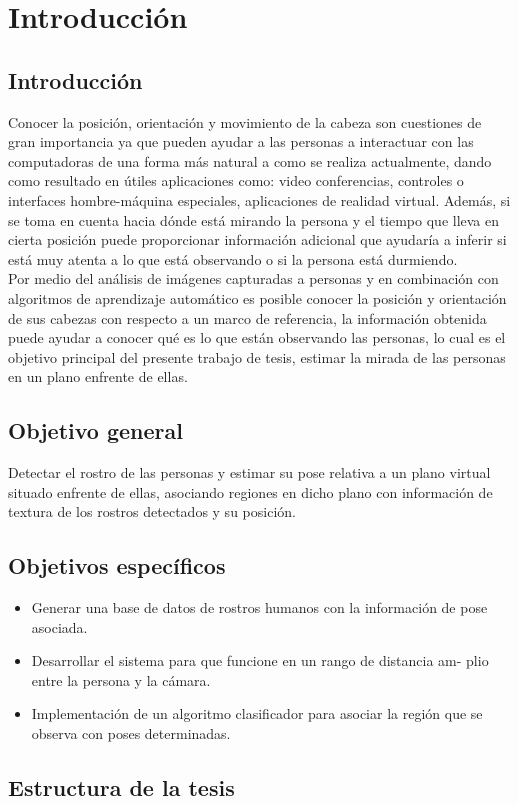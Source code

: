 \chapter{Introducción}
\section{Introducción}

  Conocer la posición, orientación y movimiento de la cabeza son cuestiones de gran importancia ya que pueden ayudar a las personas a interactuar con las computadoras de una forma más natural a como se realiza actualmente, dando como resultado en útiles  aplicaciones como: video conferencias, controles o interfaces hombre-máquina especiales, aplicaciones de realidad virtual. Además, si se toma en cuenta hacia dónde está mirando la persona y el tiempo que lleva en cierta posición puede proporcionar información adicional que ayudaría a inferir si está muy atenta a lo que está observando o si la persona está durmiendo.\\
  Por medio del análisis de imágenes capturadas a personas y en combinación con algoritmos de aprendizaje automático es posible conocer la posición y  orientación de sus cabezas con respecto a un marco de referencia, la información obtenida puede ayudar a conocer qué es lo que están observando las personas, lo cual es el objetivo principal del presente trabajo de tesis, estimar la mirada de las personas en un plano enfrente de ellas.
  
  \section{Objetivo general}
  Detectar el rostro de las personas y estimar su pose relativa a un plano virtual situado enfrente de ellas, asociando regiones en dicho plano con información de textura de los rostros detectados y su posición. 
  
  \section{Objetivos específicos}
  \begin{itemize}
  	\item Generar una base de datos de rostros humanos con la información de
  	pose asociada.
  	\item Desarrollar el sistema para que funcione en un rango de distancia am-
  	plio entre la persona y la cámara.
  	\item Implementación de un algoritmo clasificador para asociar la región que
  	se observa con poses determinadas.
  \end{itemize}
  
  \section{Estructura de la tesis}